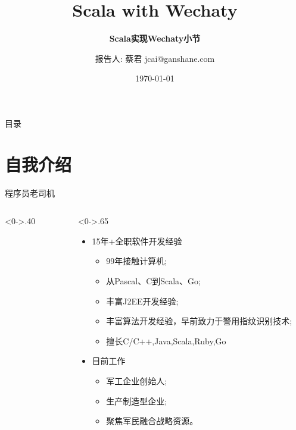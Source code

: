 \documentclass[10pt,aspectratio=43,mathserif,table]{beamer}
\title{Scala with Wechaty}
\subtitle{\fontsize{9pt}{14pt}\textbf{Scala实现Wechaty小节}}
\author{报告人: 蔡君 \newline \newline jcai@ganshane.com}
\institute{\fontsize{8pt}{14pt}https://github.com/jcai}
\date{\today}
\begin{document}

\frame{\titlepage}

\section[目录]{}   %
\begin{frame}{目录}
\tableofcontents
\end{frame}

\section{自我介绍}  %
\begin{frame}{程序员老司机}
\begin{columns}[T] %
\begin{column}<0->{.40\textwidth}
	\begin{figure}[thpb]
		\centering
		\label{fig:campus}
	\end{figure}
\end{column}%
\hfill%
\begin{column}<0->{.65\textwidth}
  \begin{itemize}
    \item<1-> 15年+全职软件开发经验
          \begin{itemize}
            \item<1-> 99年接触计算机;
            \item<1-> 从Pascal、C到Scala、Go;
            \item<1-> 丰富J2EE开发经验;
            \item<1-> 丰富算法开发经验，早前致力于警用指纹识别技术;
            \item<1-> 擅长C/C++,Java,Scala,Ruby,Go
          \end{itemize}
    \item<2-> 目前工作
          \begin{itemize}
            \item<2-> 军工企业创始人;
            \item<2-> 生产制造型企业;
            \item<2-> 聚焦军民融合战略资源。
          \end{itemize}
  \end{itemize}
\end{column}%
\end{columns}
\end{frame}
\end{document}
